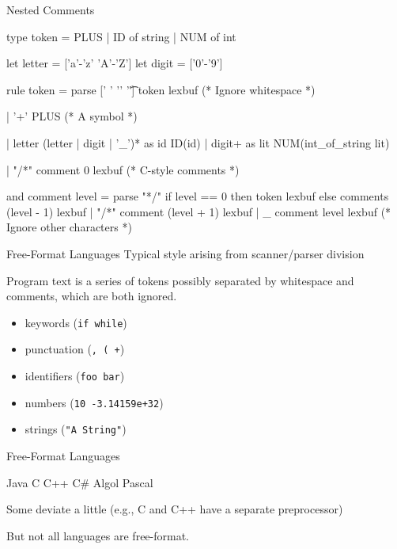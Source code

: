 \documentclass{plt}
\begin{document}
\begin{frame}[fragile]{Nested Comments}
\small
\begin{ocamllex}
{ type token = PLUS | ID of string | NUM of int }

let letter = ['a'-'z' 'A'-'Z']
let digit = ['0'-'9']

rule token =
 parse [' ' '\n' '\t'] { token lexbuf } (* Ignore whitespace *)

     | '+' { PLUS }                     (* A symbol *)

     | letter (letter | digit | '_')* as id { ID(id) }
     | digit+ as lit { NUM(int_of_string lit) }

     | "/*" { comment 0 lexbuf }          (* C-style comments *)

and comment level =
  parse "*/" { if level == 0 then token lexbuf
  	else comments (level - 1) lexbuf } 
      | "/*" { comment (level + 1) lexbuf }
      | _ { comment level lexbuf }  (* Ignore other characters *)
\end{ocamllex}

\end{frame}

\begin{frame}{Free-Format Languages}
Typical style arising from scanner/parser division

Program text is a series of tokens possibly separated by whitespace
and comments, which are both ignored.

\begin{itemize}
\item keywords (\texttt{if while})
\item punctuation (\texttt{, ( +})
\item identifiers (\texttt{foo bar})
\item numbers (\texttt{10 -3.14159e+32})
\item strings (\texttt{"A String"})
\end{itemize}

\end{frame}

\begin{frame}{Free-Format Languages}

Java \hfil C \hfil C++ \hfil C\# \hfil Algol \hfil Pascal

Some deviate a little (e.g., C and C++ have a separate preprocessor)

But not all languages are free-format.
\end{frame}
\end{document}
